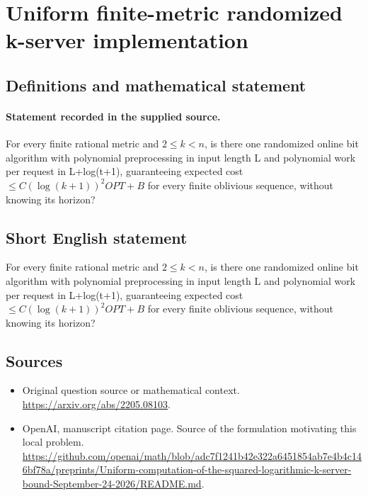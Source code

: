 \documentclass[11pt]{article}
\begin{document}
\section*{Uniform finite-metric randomized k-server implementation}\label{30007490}
\subsection{Definitions and mathematical statement}
\paragraph{Statement recorded in the supplied source.}
For every finite rational metric and $2\leq k<n$, is there one randomized online bit algorithm with polynomial preprocessing in input length L and polynomial work per request in L+log(t+1), guaranteeing expected cost $\leq C(\log (k+1))^{2}OPT+B$ for every finite oblivious sequence, without knowing its horizon?
\subsection{Short English statement}
For every finite rational metric and $2\leq k<n$, is there one randomized online bit algorithm with polynomial preprocessing in input length L and polynomial work per request in L+log(t+1), guaranteeing expected cost $\leq C(\log (k+1))^{2}OPT+B$ for every finite oblivious sequence, without knowing its horizon?
\subsection{Sources}
\begin{itemize}
\item[S1] Original question source or mathematical context.
\url{https://arxiv.org/abs/2205.08103}.
\item[S2] OpenAI, manuscript citation page. Source of the formulation motivating this local problem.
\url{https://github.com/openai/math/blob/adc7f1241b42e322a6451854ab7e4b4c146bf78a/preprints/Uniform-computation-of-the-squared-logarithmic-k-server-bound-September-24-2026/README.md}.
\end{itemize}
\end{document}
